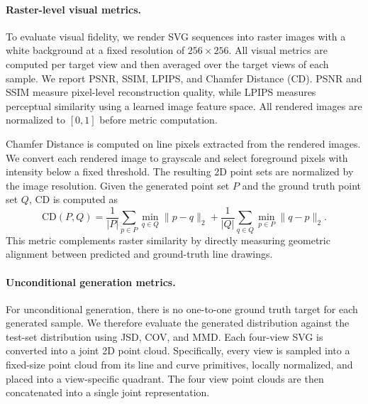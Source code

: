 \documentclass{article}
\begin{document}
\paragraph{Raster-level visual metrics.}
To evaluate visual fidelity, we render SVG sequences into raster images with a white background at a fixed resolution of $256 \times 256$. All visual metrics are computed per target view and then averaged over the target views of each sample. We report PSNR, SSIM, LPIPS, and Chamfer Distance (CD). PSNR and SSIM measure pixel-level reconstruction quality, while LPIPS measures perceptual similarity using a learned image feature space. All rendered images are normalized to $[0,1]$ before metric computation.

Chamfer Distance is computed on line pixels extracted from the rendered images. We convert each rendered image to grayscale and select foreground pixels with intensity below a fixed threshold. The resulting 2D point sets are normalized by the image resolution. Given the generated point set $P$ and the ground truth point set $Q$, CD is computed as
\begin{equation}
\mathrm{CD}(P,Q) =
\frac{1}{|P|}\sum_{p\in P}\min_{q\in Q}\|p-q\|_2
+
\frac{1}{|Q|}\sum_{q\in Q}\min_{p\in P}\|q-p\|_2 .
\end{equation}
This metric complements raster similarity by directly measuring geometric alignment between predicted and ground-truth line drawings.

\paragraph{Unconditional generation metrics.}
For unconditional generation, there is no one-to-one ground truth target for each generated sample. We therefore evaluate the generated distribution against the test-set distribution using JSD, COV, and MMD. Each four-view SVG is converted into a joint 2D point cloud. Specifically, every view is sampled into a fixed-size point cloud from its line and curve primitives, locally normalized, and placed into a view-specific quadrant. The four view point clouds are then concatenated into a single joint representation.
\end{document}
